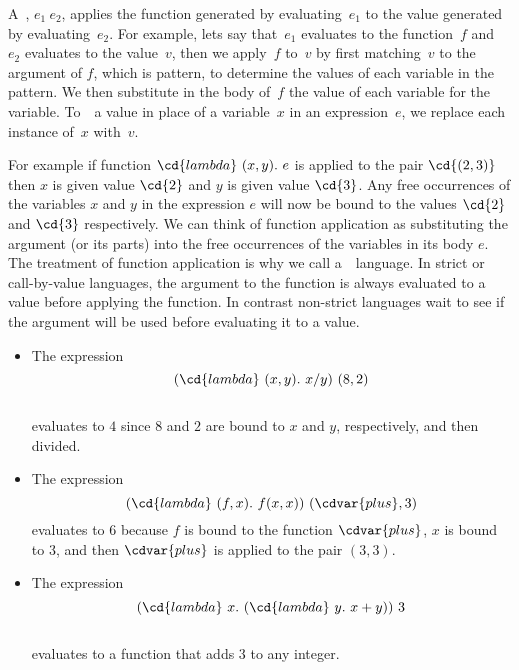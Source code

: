 \begin{cluster}
\label{grp:grm:sparc::function-application}

\begin{gram}
\label{grm:sparc::function-application}
A~, $e_1~e_2$, applies the function
generated by evaluating~$e_1$ to the value generated by
evaluating~$e_2$.  
For example, lets say that~$e_1$ evaluates to the function~$f$
and~$e_2$ evaluates to the value~$v$, then we apply~$f$ to~$v$ by
first matching~$v$ to the argument of $f$, which is pattern, to
determine the values of each variable in the pattern.
We then substitute in the body of~$f$ the value of each variable for
the variable.  To~~a value in place of a variable~$x$
in an expression~$e$, we replace each instance of~$x$ with~$v$.

For example if function $\cd{lambda}~(x,y).~e$ is applied to the pair
$\cd{(2,3)}$ then $x$ is given value $\cd{2}$ and $y$ is given value
$\cd{3}$. 
Any free occurrences of the variables $x$ and $y$ in the
expression $e$ will now be bound to the values $\cd{2}$ and $\cd{3}$
respectively.  
We can think of function application as substituting
the argument (or its parts) into the free occurrences of the variables
in its body $e$.
The treatment of function application is why we call \pml{} a~~language. 
In strict or call-by-value languages, the argument to the function is
always evaluated to a value before applying the function.
In contrast non-strict languages wait to see if the argument will be
used before evaluating it to a value. 

\end{gram}
\end{cluster}

\begin{cluster}
\label{grp:xmpl:sparc::lambda}

\begin{example}
\label{xmpl:sparc::lambda}
\begin{itemize}

\item
The expression
\[
(\cd{lambda}~(x,y).~x / y)~(8,2)
\]
\\
evaluates to $4$ since $8$ and 
$2$ are bound to $x$ and $y$, respectively, and then divided.

\item
The expression 
\[
(\cd{lambda}~(f,x).~f(x,x))~(\cdvar{plus},3)
\] 
evaluates to $6$ because $f$ is bound to the function
$\cdvar{plus}$, $x$ is bound to $3$, and then $\cdvar{plus}$ is applied
to the pair $(3,3)$.

\item
The expression
\[
(\cd{lambda}~x.~(\cd{lambda}~y .~x + y ) )~3
\]
\\
evaluates to a function that adds $3$ to any integer.
\end{itemize}

\end{example}
\end{cluster}

